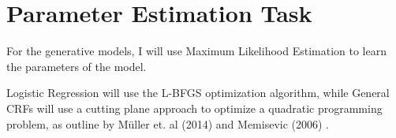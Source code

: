 \documentclass{article}
\begin{document}


\section{Parameter Estimation Task}
For the generative models, I will use Maximum Likelihood Estimation
to learn the parameters of the model.

Logistic Regression will use the L-BFGS optimization algorithm, while
General CRFs will use a cutting plane approach
to optimize a quadratic programming problem, as outline by
M{\"u}ller et. al (2014) \cite{pystruct} and Memisevic (2006) \cite{memisevic}.
\end{document}
